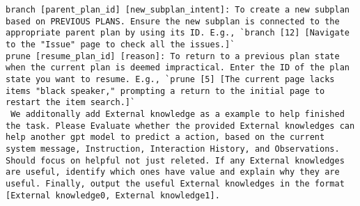 \begin{tcolorbox}[breakable]
\begin{lstlisting}
branch [parent_plan_id] [new_subplan_intent]: To create a new subplan based on PREVIOUS PLANS. Ensure the new subplan is connected to the appropriate parent plan by using its ID. E.g., `branch [12] [Navigate to the "Issue" page to check all the issues.]`
prune [resume_plan_id] [reason]: To return to a previous plan state when the current plan is deemed impractical. Enter the ID of the plan state you want to resume. E.g., `prune [5] [The current page lacks items "black speaker," prompting a return to the initial page to restart the item search.]`
 We additonally add External knowledge as a example to help finished the task. Please Evaluate whether the provided External knowledges can help another gpt model to predict a action, based on the current system message, Instruction, Interaction History, and Observations. Should focus on helpful not just releted. If any External knowledges are useful, identify which ones have value and explain why they are useful. Finally, output the useful External knowledges in the format [External knowledge0, External knowledge1].


\end{lstlisting}
\end{tcolorbox}
